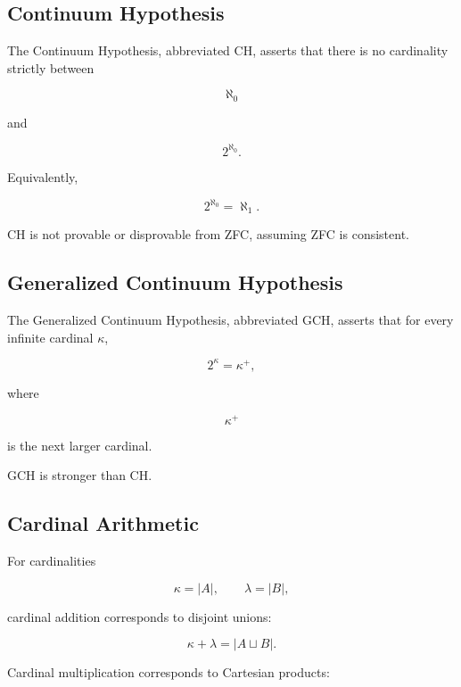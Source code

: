 \subsection{Continuum Hypothesis}
\label{subsec:continuum-hypothesis}

The Continuum Hypothesis, abbreviated CH, asserts that there is no
cardinality strictly between

\[
\aleph_0
\]

and

\[
2^{\aleph_0}.
\]

Equivalently,

\[
\boxed{
2^{\aleph_0}
=
\aleph_1.
}
\]

CH is not provable or disprovable from ZFC, assuming ZFC is consistent.

\subsection{Generalized Continuum Hypothesis}
\label{subsec:generalized-continuum-hypothesis}

The Generalized Continuum Hypothesis, abbreviated GCH, asserts that for
every infinite cardinal \(\kappa\),

\[
\boxed{
2^\kappa
=
\kappa^+,
}
\]

where

\[
\kappa^+
\]

is the next larger cardinal.

GCH is stronger than CH.

\subsection{Cardinal Arithmetic}
\label{subsec:cardinal-arithmetic}

For cardinalities

\[
\kappa=|A|,
\qquad
\lambda=|B|,
\]

cardinal addition corresponds to disjoint unions:

\[
\boxed{
\kappa+\lambda
=
|A\sqcup B|.
}
\]

Cardinal multiplication corresponds to Cartesian products:

